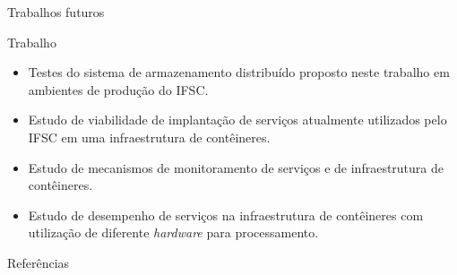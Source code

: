 \documentclass{beamer}
\begin{document}

\begin{frame}{Trabalhos futuros}
    \begin{block}{Trabalho}
    \begin{itemize}
        \item Testes do sistema de armazenamento distribuído proposto neste trabalho em ambientes de produção do IFSC.
        \item Estudo de viabilidade de implantação de serviços atualmente utilizados pelo IFSC em uma infraestrutura de contêineres.
        \item Estudo de mecanismos de monitoramento de serviços e de infraestrutura de contêineres.
        \item Estudo de desempenho de serviços na infraestrutura de contêineres com utilização de diferente \textit{hardware} para processamento.
    \end{itemize}
    \end{block}
\end{frame}


\begin{frame}{Referências}
    \footnotesize{}
\end{frame}
\end{document}
